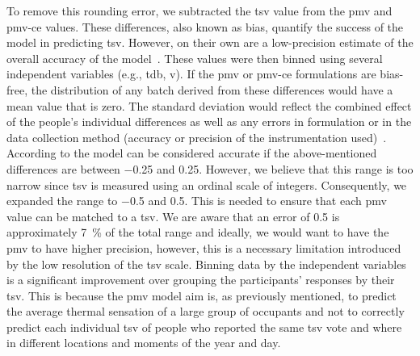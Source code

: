 To remove this rounding error, we subtracted the \ac{tsv} value from the \ac{pmv} and \ac{pmv-ce} values.
These differences, also known as bias, quantify the success of the model in predicting \ac{tsv}.
However, on their own are a low-precision estimate of the overall accuracy of the model~\cite{Humphreys2002}.
These values were then binned using several independent variables (e.g., \ac{tdb}, \ac{v}).
If the \ac{pmv} or \ac{pmv-ce} formulations are bias-free, the distribution of any batch derived from these differences would have a mean value that is zero.
The standard deviation would reflect the combined effect of the people's individual differences as well as any errors in formulation or in the data collection method (accuracy or precision of the instrumentation used)~\cite{Humphreys2002}.
According to  the model can be considered accurate if the above-mentioned differences are between \num{-0.25} and \num{0.25}.
However, we believe that this range is too narrow since \ac{tsv} is measured using an ordinal scale of integers.
Consequently, we expanded the range to \num{-.5} and \num{0.5}.
This is needed to ensure that each \ac{pmv} value can be matched to a \ac{tsv}.
We are aware that an error of \num{.5} is approximately \qty{7}{\percent} of the total range and ideally, we would want to have the \ac{pmv} to have higher precision, however, this is a necessary limitation introduced by the low resolution of the \ac{tsv} scale.
Binning data by the independent variables is a significant improvement over grouping the participants' responses by their \ac{tsv}.
This is because the \ac{pmv} model aim is, as previously mentioned, to predict the average thermal sensation of a large group of occupants and not to correctly predict each individual \ac{tsv} of people who reported the same \ac{tsv} vote and where in different locations and moments of the year and day.

